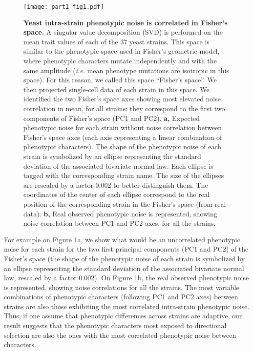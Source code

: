 \begin{figure}[!h]
\begin{adjustwidth}{-0in}{0in}
\centering
\texttt{[image: part1\_fig1.pdf]}
\end{adjustwidth}
\caption[Yeast intra-strain phenotypic noise is correlated in Fisher's space.]{
\textbf{Yeast intra-strain phenotypic noise is correlated in Fisher's space.}
A singular value decomposition (SVD) is performed on the mean trait values of each of the 37 yeast strains. This space is similar to the phenotypic space used in Fisher's geometric model, where phenotypic characters mutate independently and with the same amplitude (\textit{i.e.} mean phenotype mutations are isotropic in this space). For this reason, we called this space ``Fisher's space''. We then projected single-cell data of each strain in this space. We identified the two Fisher's space axes showing most elevated noise correlation in mean, for all strains: they correspond to the first two components of Fisher's space (PC1 and PC2).
\textbf{a,} Expected phenotypic noise for each strain without noise correlation between Fisher's space axes (each axis representing a linear combination of phenotypic characters). The shape of the phenotypic noise of each strain is symbolized by an ellipse representing the standard deviation of the associated bivariate normal law. Each ellipse is tagged with the corresponding strain name. The size of the ellipses are rescaled by a factor 0.002 to better distinguish them. The coordinates of the center of each ellipse correspond to the real position of the corresponding strain in the Fisher's space (from real data).
\textbf{b,} Real observed phenotypic noise is represented, showing noise correlation between PC1 and PC2 axes, for all the strains.
}
\label{part1:fig1}
\end{figure}

For example on Figure \ref{part1:fig1}a, we show what would be an uncorrelated phenotypic noise for each strain for the two first principal components (PC1 and PC2) of the Fisher's space (the shape of the phenotypic noise of each strain is symbolized by an ellipse representing the standard deviation of the associated bivariate normal law, rescaled by a factor 0.002). On Figure \ref{part1:fig1}b, the real observed phenotypic noise is represented, showing noise correlations for all the strains. The most variable combinations of phenotypic characters (following PC1 and PC2 axes) between strains are also those exhibiting the most correlated intra-strain phenotypic noise. Thus, if one assume that phenotypic differences across strains are adaptive, our result suggests that the phenotypic characters most exposed to directional selection are also the ones with the most correlated phenotypic noise between characters.

